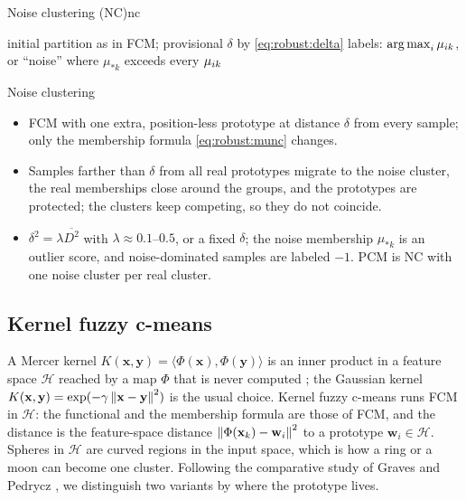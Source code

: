 \begin{algobox}{Noise clustering (NC)}{nc}
\begin{algorithm}[H]
initial partition as in FCM; provisional $\delta$ by \eqref{eq:robust:delta}\;
labels: $\operatorname{arg\,max}_i\mu_{ik}$, or ``noise'' where $\mu_{*k}$ exceeds every $\mu_{ik}$\;
\end{algorithm}
\end{algobox}
\begin{summarybox}{Noise clustering}
\begin{itemize}
  \item FCM with one extra, position-less prototype at distance $\delta$ from every sample; only the membership formula \eqref{eq:robust:munc} changes.
  \item Samples farther than $\delta$ from all real prototypes migrate to the noise cluster, the real memberships close around the groups, and the prototypes are protected; the clusters keep competing, so they do not coincide.
  \item $\delta^2=\lambda\overline{D^2}$ with $\lambda\approx0.1$--$0.5$, or a fixed $\delta$; the noise membership $\mu_{*k}$ is an outlier score, and noise-dominated samples are labeled $-1$. PCM is NC with one noise cluster per real cluster.
\end{itemize}
\end{summarybox}

\subsection{Kernel fuzzy c-means}\label{sec:robust:kernel}

A Mercer kernel $K(\mathbf{x},\mathbf{y})=\langle\Phi(\mathbf{x}),\Phi(\mathbf{y})\rangle$ is an inner product in a feature space $\mathcal{H}$ reached by a map $\Phi$ that is never computed \cite{scholkopf:2002:kernels}; the Gaussian kernel $K(\mathbf{x},\mathbf{y})=\exp(-\gamma\left\lVert \mathbf{x}-\mathbf{y} \right\rVert^2)$ is the usual choice. Kernel fuzzy c-means runs FCM in $\mathcal{H}$: the functional and the membership formula are those of FCM, and the distance is the feature-space distance $\left\lVert \Phi(\mathbf{x}_k)-\mathbf{w}_i \right\rVert^2$ to a prototype $\mathbf{w}_i\in\mathcal{H}$. Spheres in $\mathcal{H}$ are curved regions in the input space, which is how a ring or a moon can become one cluster. Following the comparative study of Graves and Pedrycz \cite{graves:2010:kernel}, we distinguish two variants by where the prototype lives.

